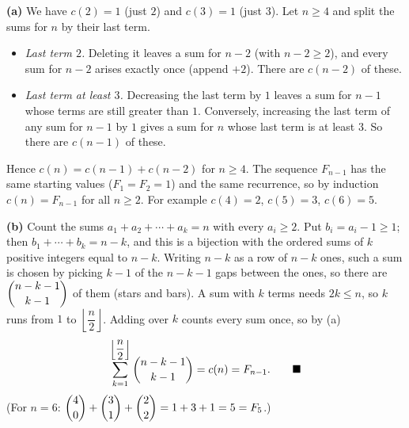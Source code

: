 \textbf{(a)} We have $c(2)=1$ (just $2$) and $c(3)=1$ (just $3$). Let $n\ge4$ and split the sums for $n$ by their last term.
\begin{itemize}
\item \emph{Last term $2$.} Deleting it leaves a sum for $n-2$ (with $n-2\ge2$), and every sum for $n-2$ arises exactly once (append $+2$). There are $c(n-2)$ of these.
\item \emph{Last term at least $3$.} Decreasing the last term by $1$ leaves a sum for $n-1$ whose terms are still greater than $1$. Conversely, increasing the last term of any sum for $n-1$ by $1$ gives a sum for $n$ whose last term is at least $3$. So there are $c(n-1)$ of these.
\end{itemize}
Hence $c(n)=c(n-1)+c(n-2)$ for $n\ge4$. The sequence $F_{n-1}$ has the same starting values ($F_1=F_2=1$) and the same recurrence, so by induction $c(n)=F_{n-1}$ for all $n\ge2$. For example $c(4)=2$, $c(5)=3$, $c(6)=5$.

\textbf{(b)} Count the sums $a_1+a_2+\cdots+a_k=n$ with every $a_i\ge2$. Put $b_i=a_i-1\ge1$; then $b_1+\cdots+b_k=n-k$, and this is a bijection with the ordered sums of $k$ positive integers equal to $n-k$. Writing $n-k$ as a row of $n-k$ ones, such a sum is chosen by picking $k-1$ of the $n-k-1$ gaps between the ones, so there are $\dbinom{n-k-1}{k-1}$ of them (stars and bars). A sum with $k$ terms needs $2k\le n$, so $k$ runs from $1$ to $\left\lfloor\dfrac n2\right\rfloor$. Adding over $k$ counts every sum once, so by (a)
\[\sum_{k=1}^{\left\lfloor \dfrac n2\right\rfloor}\dbinom{n-k-1}{k-1}=c(n)=F_{n-1}.\qquad\blacksquare\]
(For $n=6$: $\dbinom40+\dbinom31+\dbinom22=1+3+1=5=F_5$.)
